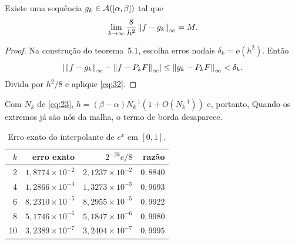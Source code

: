 \begin{corolario}
Existe uma sequência $g_k\in\mathcal A([\alpha,\beta])$ tal que
\[
\lim_{k\to\infty}\frac8{h^2}\left\|f-g_k\right\|_{\infty}=M.
\]
\end{corolario}
\begin{proof}
Na construção do teorema~5.1, escolha erros nodais $\delta_k=o(h^2)$. Então
\[
\left|\left\|f-g_k\right\|_{\infty}-\left\|f-P_kF\right\|_{\infty}\right|\le\left\|g_k-P_kF\right\|_{\infty}<\delta_k.
\]
Divida por $h^2/8$ e aplique \eqref{eq:32}.
\end{proof}
Com $N_k$ de \eqref{eq:23}, $h=(\beta-\alpha)N_k^{-1}(1+O(N_k^{-1}))$ e, portanto,
Quando os extremos já são nós da malha, o termo de borda desaparece.
\begin{table}[!htbp]\centering
\caption{Erro exato do interpolante de $e^x$ em $[0,1]$.}
\begin{tabular}{rrrr}\toprule
$k$&erro exato&$2^{-2k}e/8$&razão\\\midrule
2&$1{,}8774\times10^{-2}$&$2{,}1237\times10^{-2}$&$0{,}8840$\\
4&$1{,}2866\times10^{-3}$&$1{,}3273\times10^{-3}$&$0{,}9693$\\
6&$8{,}2310\times10^{-5}$&$8{,}2955\times10^{-5}$&$0{,}9922$\\
8&$5{,}1746\times10^{-6}$&$5{,}1847\times10^{-6}$&$0{,}9980$\\
10&$3{,}2389\times10^{-7}$&$3{,}2404\times10^{-7}$&$0{,}9995$\\\bottomrule
\end{tabular}
\end{table}
